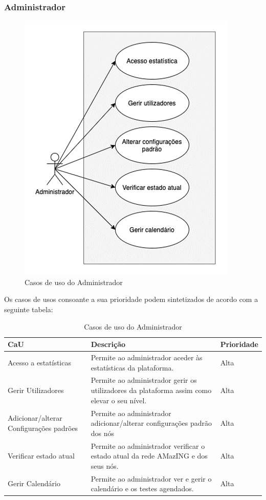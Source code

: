 \subsubsection{Administrador}
\begin{figure}[!ht]
    \centering
    \includegraphics[height=0.4\textheight]{images/CaU2.png}
    \caption{Casos de uso do Administrador}
    \label{fig:cau2}
\end{figure}
Os casos de usos consoante a sua prioridade podem sintetizados de acordo com a seguinte tabela:
\begin{table}[ht]
    \centering
        \begin{tabular}{p{}p{}p{}}
            \hline
            \textbf{CaU} &	\textbf{Descrição} &	\textbf{Prioridade} \\ 
            \hline
            Acesso a estatísticas & Permite ao administrador aceder às estatísticas da plataforma. & Alta \\
            \hline
            Gerir Utilizadores & Permite ao administrador gerir os utilizadores da plataforma assim como elevar o seu nível. & Alta \\
            \hline
            Adicionar/alterar Configurações padrões & Permite ao administrador adicionar/alterar configurações padrão dos nós & Alta \\
            \hline
            Verificar estado atual & Permite ao administrador verificar o estado atual da rede AMazING e dos seus nós. & Alta \\
            \hline
            Gerir Calendário & Permite ao administrador ver e gerir o calendário e os testes agendados. & Alta \\
            \hline
        \end{tabular}
    \caption{Casos de uso do Administrador}
    \label{myTable}
\end{table}

